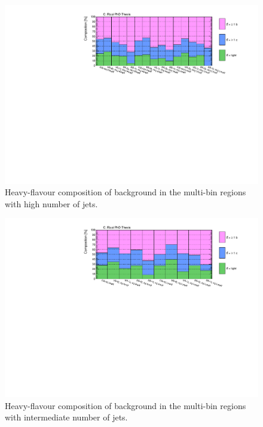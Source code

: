 \begin{figure}[htbp]
\includegraphics[width=\textwidth]{figures/strong_prod/comp_plots/Hnj_HF.pdf}
\caption{Heavy-flavour composition of \ttbar background in the multi-bin regions with high number of jets.}
	\label{fig:HFcomp_Hnj}
\end{figure}

\begin{figure}[htbp]
\includegraphics[width=\textwidth]{figures/strong_prod/comp_plots/Inj_HF.pdf}
\caption{Heavy-flavour composition of \ttbar background in the multi-bin regions with intermediate number of jets.}
	\label{fig:HFcomp_Inj}
\end{figure}

